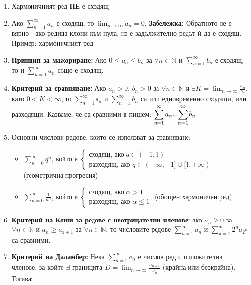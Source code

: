\documentclass[11pt,oneside,a4paper]{article}
\begin{document}
\begin{enumerate}
    \item Хармоничният ред \textbf{НЕ} е сходящ
    \item Ако \(\displaystyle \sum_{n=1}^{\infty} a_n\) е сходящ. то \(\displaystyle \lim_{n \to \infty} a_n = 0\). \textbf{Забележка: } Обратното не е вярно - ако редица клони към нула, не е задължително редът ѝ да е сходящ. Пример: хармоничният ред.
    \item \textbf{Принцип за мажориране: } Ако \(0 \leq a_n \leq b_n \) за \(\forall n \in \mathbb{N}\) и \(\displaystyle \sum_{n=1}^{\infty} b_n\) е сходящ, то и \(\displaystyle \sum_{n=1}^{\infty} a_n\) също е сходящ.
    \item \textbf{Критерий за сравняване: } Ако \(a_n > 0\), \(b_n > 0\) за \(\forall n \in \mathbb{N}\) и \(\exists K = \displaystyle \lim_{n \to \infty} \frac{a_n}{b_n}\), като \(0 < K < \infty\), то \(\displaystyle \sum_{n=1}^{\infty} а_n\) и \(\displaystyle \sum_{n=1}^{\infty} b_n\) са или едновременно сходящи, или разходящи. Казваме, че са сравними и пишем:
    \(\displaystyle \sum_{n=1}^{\infty} a_n \text{\textbf{\texttildelow}} \sum_{n=1}^{\infty} b_n \)
    \item Основни числови редове, които се използват за сравняване: 
    \begin{itemize}
        \item \(\displaystyle \sum_{n=0}^{\infty} q^n\), който е \(\begin{cases} \text{сходящ, ако } q \in (-1, 1) \\ \text{разходящ, ако } q \in (-\infty, -1] \cup [1, +\infty)\end{cases}\) (геометрична прогресия)
        \item \(\displaystyle \sum_{n=0}^{\infty} \frac{1}{n^{\alpha}}\), който е \(\begin{cases} \text{сходящ, ако } \alpha > 1 \\ \text{разходящ, ако } \alpha \leq 1\end{cases}\) (обощен хармоничен ред)
    \end{itemize}
    \item \textbf{Критерий на Коши за редове с неотрицателни членове: } ако \(a_n \geq 0\) за \(\forall n \in \mathbb{N}\) и \(a_n \geq a_{n+1}\) за \(\forall n \in \mathbb{N}\), то числовите редове \(\displaystyle \sum_{n=1}^{\infty} a_n\) и \(\displaystyle \sum_{n=1}^{\infty} 2^na_{2^n}\) са сравними.
    \item \textbf{Критерий на Даламбер: } Нека \(\displaystyle \sum_{n=1}^{\infty} a_n\) е числов ред с положителни членове, за който \(\exists\) границита \(D = \displaystyle \lim_{n \to \infty} \frac{a_{n+1}}{a_n}\) (крайна или безкрайна). Тогава: 

\end{enumerate}
\end{document}
